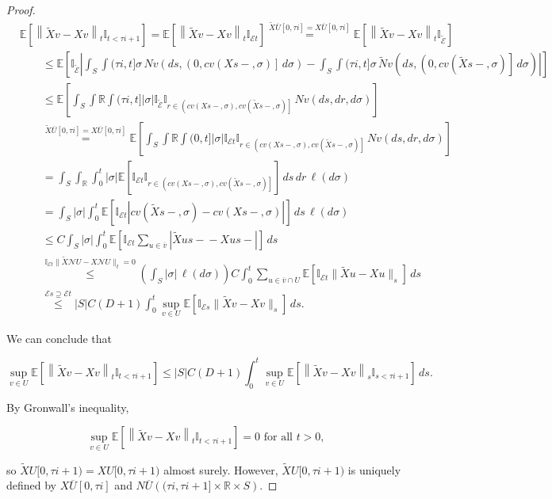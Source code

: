 \documentclass[12pt]{article}
\newcommand{\mb}{\mathbb}
\newcommand{\mc}{\mathcal}
\newcommand{\ov}{\overline}
\newcommand{\os}{\overset}
\newcommand{\te}{\text}
\newcommand{\ind}{\hspace{24pt}}
\newcommand{\ex}[1]{\mb{E}\left[#1\right]}			%
\renewcommand{\v}{v}							%
\newcommand{\vv}{u}								%
\renewcommand{\U}{U}							%
\renewcommand{\S}{S}							%
\newcommand{\s}{\sigma}							%
\renewcommand{\t}{t}							%
\renewcommand{\tt}{s}							%
\newcommand{\X}{X}								%
\newcommand{\IGr}{c}							%
\newcommand{\neigh}{\mc{N}}						%
\newcommand{\cl}{\ov}							%
\newcommand{\const}{C}							%
\newcommand{\degr}{D}							%
\newcommand{\poiss}{N}							%
\newcommand{\Sm}{\ell}							%
\renewcommand{\r}{r}							%
\newcommand{\alt}[1]{\widetilde{#1}}			%
\newcommand{\rt}{\tau}							%
\newcommand{\evnt}{\mc{E}}						%
\begin{document}
\begin{proof}
\begin{align*}
&\ex{\left\|\alt{\X}{\v}{} - \X{\v}{}\right\|_{\t}\mb{I}_{\t < \rt{i+1}}} = \ex{\left\|\alt{\X}{\v}{} - \X{\v}{}\right\|_{\t}\mb{I}_{\evnt{\t}}}\os{\alt{\X}{\cl{\U}}{}[0,\rt{i}] = \X{\cl{\U}}{[0,\rt{i}]}}{=} \ex{\left\|\alt{\X}{\v}{} - \X{\v}{}\right\|_{\t}\mb{I}_{\alt{\evnt}{	}}}\\
&\ind\leq \ex{\mb{I}_{\alt{\evnt}{	}}\left|\int_\S\int{(\rt{i},\t]} \s\,\poiss{\v}\left(d\tt,\left(0,\IGr{\v}(\X{}{\tt-},\s)\right]\,d\s\right) - \int_\S\int{(\rt{i},\t]} \s\,\alt{\poiss}{\v}\left(d\tt,\left(0,\IGr{\v}(\alt{\X}{}{\tt-},\s)\right]\,d\s\right)\right|}\\
&\ind \leq \ex{\int_\S\int{\mb{R}}\int{(\rt{i},\t]}|\s|\mb{I}_{\alt{\evnt}{	}}\mb{I}_{\r\in \left(\IGr{\v}(\X{}{\tt-},\s), \IGr{\v}(\alt{\X}{}{\tt-},\s)\right]}\,\poiss{\v}\left(d\tt,d\r,d\s\right)}\\
&\ind \os{\alt{\X}{\cl{\U}}{}[0,\rt{i}] = \X{\cl{\U}}{[0,\rt{i}]}}{=} \ex{\int_\S\int{\mb{R}}\int{(0,\t]}|\s|\mb{I}_{\evnt{\t}}\mb{I}_{\r\in \left(\IGr{\v}(\X{}{\tt-},\s), \IGr{\v}(\alt{\X}{}{\tt-},\s)\right]}\,\poiss{\v}\left(d\tt,d\r,d\s\right)}\\
&\ind = \int_\S\int_\mb{R}\int_0^\t |\s|\ex{\mb{I}_{\evnt{\t}}\mb{I}_{\r\in\left(\IGr{\v}(\X{}{\tt-},\s),\IGr{\v}(\alt{\X}{}{\tt-},\s)\right]}}\,d\tt\,d\r\,\Sm(d\s)\\
&\ind = \int_\S |\s|\int_0^\t \ex{\mb{I}_{\evnt{\t}}\left|\IGr{\v}(\alt{\X}{}{\tt-},\s) - \IGr{\v}(\X{}{\tt-},\s)\right|}\,d\tt\,\Sm(d\s)\\
&\ind \leq \const{}\int_\S|\s|\int_0^\t\ex{\mb{I}_{\evnt{\t}}\sum_{\vv\in \cl{\v}}\left|\alt{\X}{\vv}{\tt-} - \X{\vv}{\tt-}\right|}\,d\tt\\
&\ind \os{\mb{I}_{\evnt{\t}}\|\alt{\X}{\neigh{\U}}{} - \X{\neigh{\U}}{}\|_\t = 0}{\leq} \left(\int_\S|\s|\,\Sm(d\s)\right)\const{} \int_0^\t \sum_{\vv\in \cl{\v}\cap\U}\ex{\mb{I}_{\evnt{\t}}\|\alt{\X}{\vv}{} - \X{\vv}{}\|_\tt}\,d\tt\\
&\ind \os{\evnt{\tt} \supseteq \evnt{\t}}{\leq} |\S|\const{}(\degr+1) \int_0^\t \sup_{\v\in \U}\ex{\mb{I}_{\evnt{\tt}}\|\alt{\X}{\v}{} - \X{\v}{}\|_\tt}\,d\tt.
\end{align*}

We can conclude that

\[\sup_{\v\in \U}\ex{\left\|\alt{\X}{\v}{} - \X{\v}{}\right\|_{\t}\mb{I}_{\t <\rt{i+1}}} \leq |\S|\const{}(\degr+1)\int_0^\t\sup_{v\in\U}\ex{\left\|\alt{\X}{\v}{} - \X{\v}{}\right\|_\tt\mb{I}_{\tt < \rt{i+1}}}\,d\tt.\]

By Gronwall's inequality,

\[\sup_{v\in \U}\ex{\left\|\alt{\X}{\v}{} - \X{\v}{}\right\|_\t\mb{I}_{\t < \rt{i+1}}} = 0 \te{ for all } \t > 0,\]

so \(\alt{\X}{\U}{}[0,\rt{i+1}) = \X{\U}{[0,\rt{i+1})}\) almost surely. However, \(\alt{\X}{\U}{}[0,\rt{i+1})\) is uniquely defined by \(\X{\cl{\U}}{[0,\rt{i}]}\) and \(\poiss{\cl{\U}}\left((\rt{i},\rt{i+1}]\times \mb{R}\times \S\right)\).
\end{proof}
\end{document}
